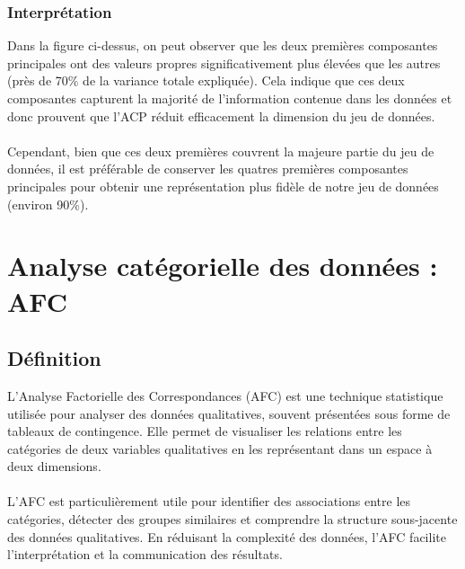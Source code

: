\documentclass[12pt]{scrartcl}
\begin{document}
            \subsubsection{Interprétation}
                Dans la figure ci-dessus, on peut observer que les deux premières composantes principales ont des valeurs propres significativement plus élevées que les autres (près de 70\% de la variance totale expliquée). Cela indique que ces deux composantes capturent la majorité de l'information contenue dans les données et donc prouvent que l'ACP réduit efficacement la dimension du jeu de données.\\\\
                Cependant, bien que ces deux premières couvrent la majeure partie du jeu de données, il est préférable de conserver les quatres premières composantes principales pour obtenir une représentation plus fidèle de notre jeu de données (environ 90\%).\\                
            
                
        
    \section{Analyse catégorielle des données : AFC}

        \subsection{Définition}
            L'Analyse Factorielle des Correspondances (AFC) est une technique statistique utilisée pour analyser des données qualitatives, souvent présentées sous forme de tableaux de contingence. Elle permet de visualiser les relations entre les catégories de deux variables qualitatives en les représentant dans un espace à deux dimensions.\\\\
            L'AFC est particulièrement utile pour identifier des associations entre les catégories, détecter des groupes similaires et comprendre la structure sous-jacente des données qualitatives. En réduisant la complexité des données, l'AFC facilite l'interprétation et la communication des résultats.\\
\end{document}
